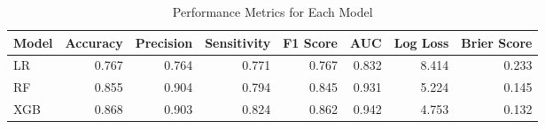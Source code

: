 \begin{table}[H]\centering
\caption{Performance Metrics for Each Model}
\label{Table 3 :performance_metrics}
\begin{tabular}{lrrrrrrr}
\toprule
Model & Accuracy & Precision & Sensitivity & F1 Score & AUC & Log Loss & Brier Score \\
\midrule
LR & 0.767 & 0.764 & 0.771 & 0.767 & 0.832 & 8.414 & 0.233 \\
RF & 0.855 & 0.904 & 0.794 & 0.845 & 0.931 & 5.224 & 0.145 \\
XGB & 0.868 & 0.903 & 0.824 & 0.862 & 0.942 & 4.753 & 0.132 \\
\bottomrule
\end{tabular}
\end{table}

